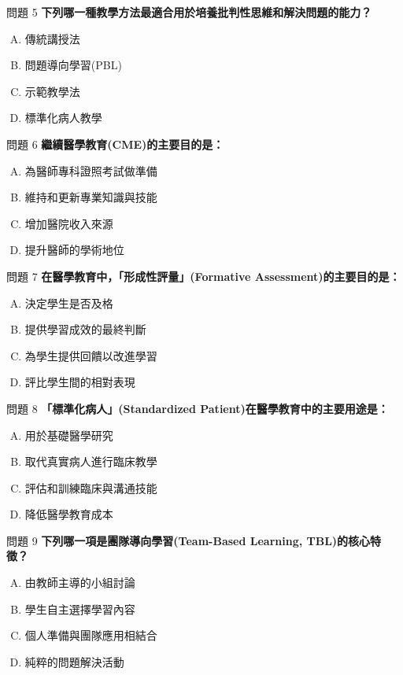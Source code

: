 \documentclass[aspectratio=169]{beamer}
\begin{document}
\begin{frame}{問題 5}
  \textbf{下列哪一種教學方法最適合用於培養批判性思維和解決問題的能力？}
  \begin{enumerate}[A.]
    \item 傳統講授法
    \item 問題導向學習(PBL)
    \item 示範教學法
    \item 標準化病人教學
  \end{enumerate}
\end{frame}

\begin{frame}{問題 6}
  \textbf{繼續醫學教育(CME)的主要目的是：}
  \begin{enumerate}[A.]
    \item 為醫師專科證照考試做準備
    \item 維持和更新專業知識與技能
    \item 增加醫院收入來源
    \item 提升醫師的學術地位
  \end{enumerate}
\end{frame}

\begin{frame}{問題 7}
  \textbf{在醫學教育中，「形成性評量」(Formative Assessment)的主要目的是：}
  \begin{enumerate}[A.]
    \item 決定學生是否及格
    \item 提供學習成效的最終判斷
    \item 為學生提供回饋以改進學習
    \item 評比學生間的相對表現
  \end{enumerate}
\end{frame}

\begin{frame}{問題 8}
  \textbf{「標準化病人」(Standardized Patient)在醫學教育中的主要用途是：}
  \begin{enumerate}[A.]
    \item 用於基礎醫學研究
    \item 取代真實病人進行臨床教學
    \item 評估和訓練臨床與溝通技能
    \item 降低醫學教育成本
  \end{enumerate}
\end{frame}

\begin{frame}{問題 9}
  \textbf{下列哪一項是團隊導向學習(Team-Based Learning, TBL)的核心特徵？}
  \begin{enumerate}[A.]
    \item 由教師主導的小組討論
    \item 學生自主選擇學習內容
    \item 個人準備與團隊應用相結合
    \item 純粹的問題解決活動
  \end{enumerate}
\end{frame}
\end{document}
